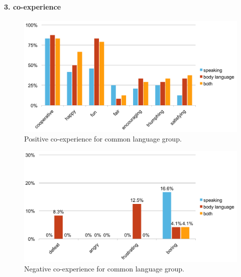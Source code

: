 


\paragraph{3. co-experience}

\begin{figure}[!h]
\centering
\includegraphics[width=0.9\columnwidth]{Figures/US_Co-ex_Com_Pos.pdf}
\caption{Positive co-experience for common language group.}
\label{fig:US_Co-ex_Com_Pos}
\end{figure}

\begin{figure}[!h]
\centering
\includegraphics[width=0.9\columnwidth]{Figures/US_Co-ex_Com_Neg.pdf}
\caption{Negative co-experience for common language group.}
\label{fig:US_Co-ex_Com_Neg}
\end{figure}

